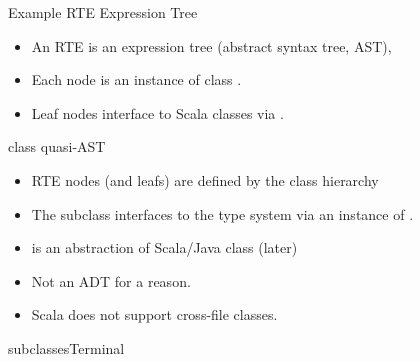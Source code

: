 \newsavebox\rteast
\begin{lrbox}{\rteast}
  \begin{minipage}{11cm}
    
  \end{minipage}
\end{lrbox}


\begin{frame}{Example RTE Expression Tree}
  \usebox\rteast

  \medskip

  \centering

  \scalebox{0.7}{}
  \begin{itemize}
  \item An RTE is an expression tree (abstract syntax
    tree, AST),
  \item Each node is an instance of class .
  \item Leaf nodes interface to Scala classes via .
  \end{itemize}
\end{frame}

\begin{frame}{ class quasi-AST}
  \scalebox{0.6}{}

  \medskip

  \begin{itemize}
  \item RTE nodes (and leafs) are defined by the class hierarchy 
  \item The subclass  interfaces to the type system via an instance of .
  \item {} is an abstraction of Scala/Java class (later)
  \item Not an ADT for a  reason.
  \item Scala does not support cross-file  classes.
  \end{itemize}
\end{frame}

\newsavebox\leafbox
\begin{lrbox}{\leafbox}
  \begin{minipage}{12cm}
    
  \end{minipage}
\end{lrbox}

\begin{frame}{ subclasses}{Terminal}
  \usebox\leafbox
\end{frame}

